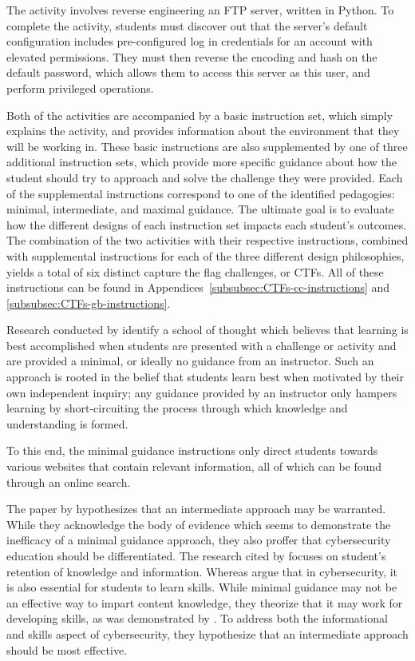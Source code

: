     The activity involves reverse engineering an FTP server, written in Python. 
    To complete the activity, students must discover out that the server's default configuration includes pre-configured log in credentials for an account with elevated permissions. 
    They must then reverse the encoding and hash on the default password, which allows them to access this server as this user, and perform privileged operations. 

    Both of the activities are accompanied by a basic instruction set, which simply explains the activity, and provides information about the environment that they will be working in. 
    These basic instructions are also supplemented by one of three additional instruction sets, which provide more specific guidance about how the student should try to approach and solve the challenge they were provided. 
    Each of the supplemental instructions correspond to one of the identified pedagogies: minimal, intermediate, and maximal guidance. 
    The ultimate goal is to evaluate how the different designs of each instruction set impacts each student's outcomes.
    The combination of the two activities with their respective instructions, combined with supplemental instructions for each of the three different design philosophies, yields a total of six distinct capture the flag challenges, or CTFs. 
    All of these instructions can be found in Appendices~\ref{subsubsec:CTFs-cc-instructions} and \ref{subsubsec:CTFs-gb-instructions}.

        Research conducted by \textcite{J-Sweller,R-Weiss} identify a school of thought which believes that learning is best accomplished when students are presented with a challenge or activity and are provided a minimal, or ideally no guidance from an instructor. 
        Such an approach is rooted in the belief that students learn best when motivated by their own independent inquiry; 
        any guidance provided by an instructor only hampers learning by short-circuiting the process through which knowledge and understanding is formed. 

        To this end, the minimal guidance instructions only direct students towards various websites that contain relevant information, all of which can be found through an online search. 

        The paper by \textcite{R-Weiss} hypothesizes that an intermediate approach may be warranted. 
        While they acknowledge the body of evidence which seems to demonstrate the inefficacy of a minimal guidance approach, they also proffer that cybersecurity education should be differentiated. 
        The research cited by \citeauthor{J-Sweller} focuses on student's retention of knowledge and information. 
        Whereas \citeauthor{R-Weiss} argue that in cybersecurity, it is also essential for students to learn skills. 
        While minimal guidance may not be an effective way to impart content knowledge, they theorize that it may work for developing skills, as was demonstrated by \textcite{C-Kussmaul}.
        To address both the informational and skills aspect of cybersecurity, they hypothesize that an intermediate approach should be most effective. 

